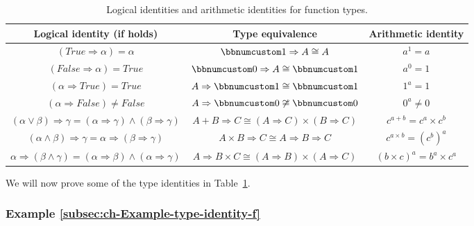 \begin{table}
\begin{centering}
\begin{tabular}{|c|c|c|}
\hline 
\textbf{\small{}Logical identity (if holds)} & \textbf{\small{}Type equivalence} & \textbf{\small{}Arithmetic identity}\tabularnewline
\hline 
\hline 
{\small{}$\left(True\Rightarrow\alpha\right)=\alpha$} & {\small{}$\bbnum 1\Rightarrow A\cong A$} & {\small{}$a^{1}=a$}\tabularnewline
\hline 
{\small{}$\left(False\Rightarrow\alpha\right)=True$} & {\small{}$\bbnum 0\Rightarrow A\cong\bbnum 1$} & {\small{}$a^{0}=1$}\tabularnewline
\hline 
{\small{}$\left(\alpha\Rightarrow True\right)=True$} & {\small{}$A\Rightarrow\bbnum 1\cong\bbnum 1$} & {\small{}$1^{a}=1$}\tabularnewline
\hline 
{\small{}$\left(\alpha\Rightarrow False\right)\neq False$} & {\small{}$A\Rightarrow\bbnum 0\not\cong\bbnum 0$} & {\small{}$0^{a}\neq0$}\tabularnewline
\hline 
{\small{}$\left(\alpha\vee\beta\right)\Rightarrow\gamma=\left(\alpha\Rightarrow\gamma\right)\wedge\left(\beta\Rightarrow\gamma\right)$} & {\small{}$A+B\Rightarrow C\cong\left(A\Rightarrow C\right)\times\left(B\Rightarrow C\right)$} & {\small{}$c^{a+b}=c^{a}\times c^{b}$}\tabularnewline
\hline 
{\small{}$(\alpha\wedge\beta)\Rightarrow\gamma=\alpha\Rightarrow\left(\beta\Rightarrow\gamma\right)$} & {\small{}$A\times B\Rightarrow C\cong A\Rightarrow B\Rightarrow C$} & {\small{}$c^{a\times b}=\left(c^{b}\right)^{a}$}\tabularnewline
\hline 
{\small{}$\alpha\Rightarrow\left(\beta\wedge\gamma\right)=\left(\alpha\Rightarrow\beta\right)\wedge\left(\alpha\Rightarrow\gamma\right)$} & {\small{}$A\Rightarrow B\times C\cong\left(A\Rightarrow B\right)\times\left(A\Rightarrow C\right)$} & {\small{}$\left(b\times c\right)^{a}=b^{a}\times c^{a}$}\tabularnewline
\hline 
\end{tabular}
\par\end{centering}
\caption{Logical identities and arithmetic identities for function types.\label{tab:Logical-identities-with-function-types}}
\end{table}

We will now prove some of the type identities in Table~\ref{tab:Logical-identities-with-function-types}.

\subsubsection{Example \label{subsec:ch-Example-type-identity-f}\ref{subsec:ch-Example-type-identity-f}}

